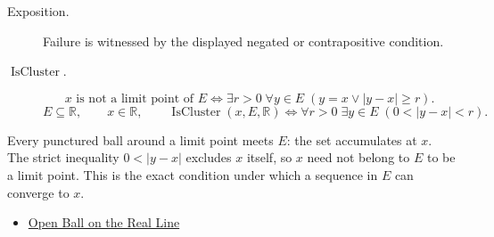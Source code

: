 \begin{remark*}
\begin{description}
  \item[Exposition.]
  Failure is witnessed by the displayed negated or contrapositive condition.

  \item[\(\operatorname{IsCluster}.\)]
  \[
x \text{ is not a limit point of } E \Longleftrightarrow \exists r>0\;\forall y\in E\;(y=x \lor |y-x|\geq r).
\]
\[
E\subseteq\mathbb{R},\qquad x\in\mathbb{R},\qquad
\operatorname{IsCluster}(x,E,\mathbb{R})
\Longleftrightarrow
\forall r>0\;\exists y\in E\;(0<|y-x|<r).
\]
\end{description}
\end{remark*}
\begin{remark*}[Interpretation]
Every punctured ball around a limit point meets $E$: the set accumulates at $x$. The strict inequality $0<|y-x|$ excludes $x$ itself, so $x$ need not belong to $E$ to be a limit point. This is the exact condition under which a sequence in $E$ can converge to $x$.
\end{remark*}
\begin{dependencies}
\begin{itemize}
  \item \hyperref[def:open-ball]{Open Ball on the Real Line}
\end{itemize}
\end{dependencies}
